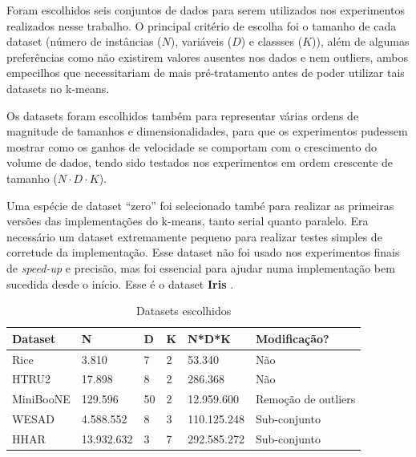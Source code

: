 \documentclass[12pt,
openright, 
oneside, %
a4paper,    %
brazil]{facom-ufu-abntex2}
\begin{document}
Foram escolhidos seis conjuntos de dados para serem utilizados nos experimentos realizados nesse trabalho. O principal critério de escolha foi o tamanho de cada dataset (número de instâncias ($N$), variáveis ($D$) e classses ($K$)), além de algumas preferências como não existirem valores ausentes nos dados e nem outliers, ambos empecilhos que necessitariam de mais pré-tratamento antes de poder utilizar tais datasets no k-means.

Os datasets foram escolhidos também para representar várias ordens de magnitude de tamanhos e dimensionalidades, para que os experimentos pudessem mostrar como os ganhos de velocidade se comportam com o crescimento do volume de dados, tendo sido testados nos experimentos em ordem crescente de tamanho ($N \cdot D \cdot K$).

Uma espécie de dataset \enquote{zero} foi selecionado també para realizar as primeiras versões das implementações do k-means, tanto serial quanto paralelo. Era necessário um dataset extremamente pequeno para realizar testes simples de corretude da implementação. Esse dataset não foi usado nos experimentos finais de \textit{speed-up} e precisão, mas foi essencial para ajudar numa implementação bem sucedida desde o início. Esse é o dataset \textbf{Iris} \cite{irisDataset}.






\begin{table}[h]
  \centering
  \caption{Datasets escolhidos}
  \label{tab:datasetsEscolhidos}
  \begin{tabular}{|l|l|l|l|l|l|}
  \hline
  \rowcolor[HTML]{9B9B9B} 
  \textbf{Dataset} & \textbf{N} & \textbf{D} & \textbf{K} & \textbf{N*D*K} & \textbf{Modificação?} \\ \hline
  Rice             & 3.810      & 7          & 2          & 53.340         & Não                   \\ \hline
  HTRU2            & 17.898     & 8          & 2          & 286.368        & Não                   \\ \hline
  MiniBooNE        & 129.596    & 50         & 2          & 12.959.600     & Remoção de outliers   \\ \hline
  WESAD            & 4.588.552  & 8          & 3          & 110.125.248    & Sub-conjunto          \\ \hline
  HHAR             & 13.932.632 & 3          & 7          & 292.585.272    & Sub-conjunto          \\ \hline
  \end{tabular}
\end{table}
\end{document}
